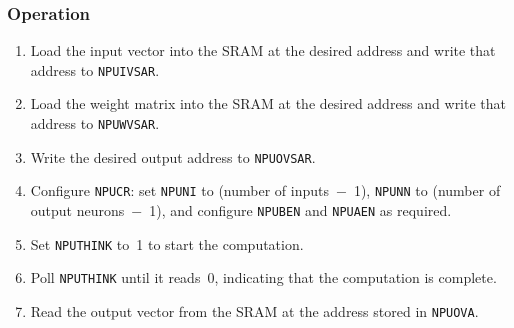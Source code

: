 \subsubsection*{Operation}

\begin{enumerate}
    \item Load the input vector into the SRAM at the desired address and write that address to \texttt{NPUIVSAR}.
    \item Load the weight matrix into the SRAM at the desired address and write that address to \texttt{NPUWVSAR}.
    \item Write the desired output address to \texttt{NPUOVSAR}.
    \item Configure \texttt{NPUCR}: set \texttt{NPUNI} to (number of inputs~$-$~1), \texttt{NPUNN} to (number of output neurons~$-$~1), and configure \texttt{NPUBEN} and \texttt{NPUAEN} as required.
    \item Set \texttt{NPUTHINK} to~1 to start the computation.
    \item Poll \texttt{NPUTHINK} until it reads~0, indicating that the computation is complete.
    \item Read the output vector from the SRAM at the address stored in \texttt{NPUOVA}.
\end{enumerate}
